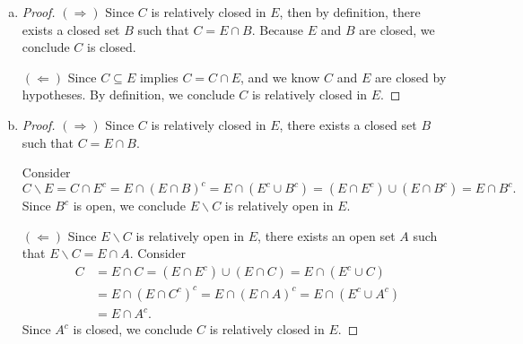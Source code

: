 \begin{Exercise}
\begin{enumerate}[a)]
\item
\begin{proof}
$(\Longrightarrow)$
Since $C$ is relatively closed in $E$, then by definition, there exists a closed set $B$ such that $C=E\cap B$. Because $E$ and $B$ are closed, we conclude $C$ is closed.

$(\Longleftarrow)$
Since $C\subseteq E$ implies $C=C\cap E$, and we know $C$ and $E$ are closed by hypotheses. By definition, we conclude $C$ is relatively closed in $E$.
\end{proof}

\item
\begin{proof}
$(\Longrightarrow)$
Since $C$ is relatively closed in $E$, there exists a closed set $B$ such that $C=E\cap B$.

Consider
$$
C\backslash E 
= C\cap E^c 
= E\cap \left(E\cap B \right)^c 
= E\cap \left( E^c\cup B^c \right) 
= \left( E\cap E^c\right) \cup \left( E \cap B^c\right)
= E\cap B^c.
$$
Since $B^c$ is open, we conclude $E\backslash C$ is relatively open in $E$.

$(\Longleftarrow)$
Since $E\backslash C$ is relatively open in $E$, there exists an open set $A$ such that $E\backslash C = E\cap A$. Consider
\begin{align*}
C
&= E\cap C
= \left( E\cap E^c \right) \cup \left(E \cap C\right)
= E\cap \left( E^c \cup C \right) \\
&= E\cap \left( E\cap C^c \right)^c
= E\cap \left( E\cap A \right)^c
= E\cap \left( E^c \cup A^c \right) \\
&= E \cap A^c.
\end{align*}
Since $A^c$ is closed, we conclude $C$ is relatively closed in $E$.
\end{proof}

\end{enumerate}
\end{Exercise}